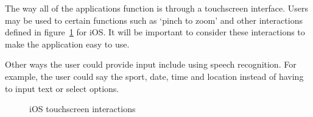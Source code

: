 The way all of the applications function is through a touchscreen interface.
Users may be used to certain functions such as `pinch to zoom' and other
interactions defined in figure~\ref{fig:iOS_touch2} for iOS\@. It will be
important to consider these interactions to make the application easy to use.

Other ways the user could provide input include using speech recognition. For
example, the user could say the sport, date, time and location instead of
having to input text or select options.

\begin{figure}[htbp]
	\centering
	\caption{iOS touchscreen interactions}\label{fig:iOS_touch2}
\end{figure}

